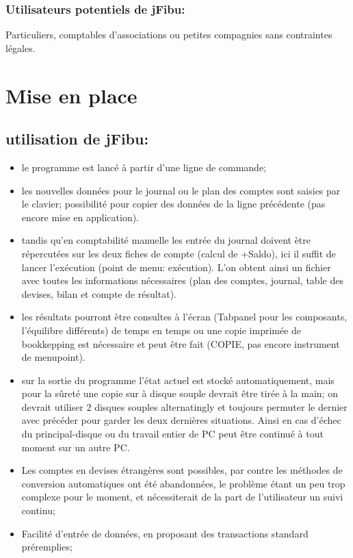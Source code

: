 \documentclass[12pt]{report}
\begin{document}
\subsection{Utilisateurs potentiels de  jFibu:} 

 Particuliers, comptables d'associations ou petites compagnies sans contraintes légales.


\chapter{Mise en place}

\section{utilisation de jFibu: }

\begin{itemize}

\item le programme  est lancé à partir d'une ligne de commande;

\item les nouvelles données pour le journal ou le plan des comptes sont saisies
par le clavier;  possibilité pour copier des données de la ligne précédente
(pas encore mise en application).

\item tandis qu'en comptabilité manuelle les  entrée du journal doivent ètre
répercutées sur les deux fiches de compte (calcul de +Saldo), ici
il suffit de lancer l'exécution (point de menu: exécution). L'on obtent ainsi un fichier avec toutes les informations nécessaires (plan des comptes,
journal, table des devises, bilan et  compte de résultat).

\item les résultats pourront ètre consultes à l'écran (Tabpanel pour les
composants, l'équilibre différents) de temps en temps ou une copie
imprimée de bookkepping est nécessaire et peut être fait (COPIE, pas encore
instrument de menupoint).

\item sur la sortie du programme l'état actuel est stocké automatiquement, mais
pour la sûreté une copie sur à disque souple devrait être tirée à la main;  on
devrait utiliser 2 disques souples alternatingly et toujours permuter le
dernier avec précéder pour garder les deux dernières situations.  Ainsi en cas
d'échec du principal-disque ou du travail entier de PC peut être continué à
tout moment sur un autre PC.

\item Les comptes en devises étrangères sont possibles, par contre les méthodes
de conversion automatiques ont été abandonnées, le problème étant un peu trop
complexe pour le moment, et nécessiterait de la part de l'utilisateur un suivi
continu;


\item Facilité d'entrée de données, en proposant des transactions standard
préremplies;
\end{itemize}
\end{document}
